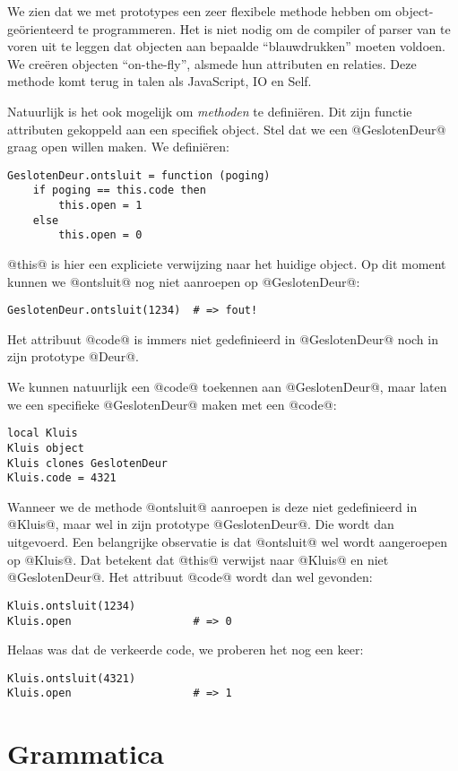 We zien dat we met prototypes een zeer flexibele methode hebben om object-geörienteerd te programmeren. Het is niet nodig om de compiler of parser van te voren uit te leggen dat objecten aan bepaalde \enquote{blauwdrukken} moeten voldoen. We creëren objecten \enquote{on-the-fly}, alsmede hun attributen en relaties. Deze methode komt terug in talen als JavaScript, IO en Self.

Natuurlijk is het ook mogelijk om \emph{methoden} te definiëren. Dit zijn functie attributen gekoppeld aan een specifiek object. Stel dat we een @GeslotenDeur@ graag open willen maken. We definiëren:
\begin{lstlisting}[name=deuren]
GeslotenDeur.ontsluit = function (poging)
    if poging == this.code then
        this.open = 1
    else
        this.open = 0
\end{lstlisting}
@this@ is hier een expliciete verwijzing naar het huidige object. Op dit moment kunnen we @ontsluit@ nog niet aanroepen op @GeslotenDeur@:
\begin{lstlisting}[name=deuren]
GeslotenDeur.ontsluit(1234)  # => fout!
\end{lstlisting}
Het attribuut @code@ is immers niet gedefinieerd in @GeslotenDeur@ noch in zijn prototype @Deur@.

We kunnen natuurlijk een @code@ toekennen aan @GeslotenDeur@, maar laten we een specifieke @GeslotenDeur@ maken met een @code@:
\begin{lstlisting}[name=deuren]
local Kluis
Kluis object
Kluis clones GeslotenDeur
Kluis.code = 4321
\end{lstlisting}
Wanneer we de methode @ontsluit@ aanroepen is deze niet gedefinieerd in @Kluis@, maar wel in zijn prototype @GeslotenDeur@. Die wordt dan uitgevoerd. Een belangrijke observatie is dat @ontsluit@ wel wordt aangeroepen op @Kluis@. Dat betekent dat @this@ verwijst naar @Kluis@ en niet @GeslotenDeur@. Het attribuut @code@ wordt dan wel gevonden:
\begin{lstlisting}[name=deuren]
Kluis.ontsluit(1234)
Kluis.open                   # => 0
\end{lstlisting}
Helaas was dat de verkeerde code, we proberen het nog een keer:
\begin{lstlisting}[name=deuren]
Kluis.ontsluit(4321)
Kluis.open                   # => 1
\end{lstlisting}

\section{Grammatica}

